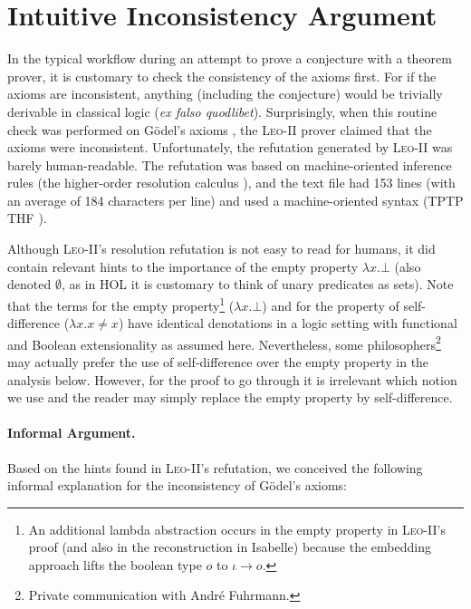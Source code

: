 \documentclass{llncs}
\newcommand{\imp}{{\rightarrow}}
\begin{document}
\section{Intuitive Inconsistency Argument} \label{sec:inconsistency}

In the typical workflow during an attempt to prove a conjecture with a
theorem prover, it is customary to check the consistency of the axioms
first. For if the axioms are inconsistent, anything (including the
conjecture) would be trivially derivable in classical logic (\emph{ex
  falso quodlibet}). Surprisingly, when this routine check was
performed on G\"odel's axioms \cite{C40}, the \textsc{Leo-II} prover
claimed that the axioms were inconsistent. Unfortunately, the
refutation generated by \textsc{Leo-II} was barely human-readable. The refutation was based on machine-oriented inference rules (the higher-order resolution calculus \cite{W47}), and the
text file had 153 lines (with an average of 184
  characters per line) and used a machine-oriented syntax (TPTP THF
\cite{J22}). 


Although \textsc{Leo-II}'s resolution refutation is not easy to read
for humans, it did contain relevant hints to the importance of the
empty property $\lambda x. \bot$ (also denoted $\emptyset$, as in HOL it is customary to think of unary predicates as sets).
%
Note that the terms for the empty property\footnote{An additional lambda abstraction occurs in the empty property in \textsc{Leo-II}'s proof (and also in the reconstruction in Isabelle) because the embedding approach lifts the boolean type $o$ to $\iota \imp o$.} ($\lambda x. \bot$) and for the property of self-difference ($\lambda x.  x\not=x$) have identical denotations in a logic setting
with functional and Boolean extensionality as assumed
here. Nevertheless, some philosophers\footnote{Private communication with Andr\'e Fuhrmann.} may actually prefer the use of
self-difference over the empty property in
the analysis below. However, for the proof to go through it is
irrelevant which notion we use and the reader may simply replace the
empty property by self-difference.



\paragraph{Informal Argument.} \label{sec:arg1}
Based on the hints found in \textsc{Leo-II}'s refutation, we conceived the following informal explanation for the inconsistency of G\"odel's axioms:
\end{document}
